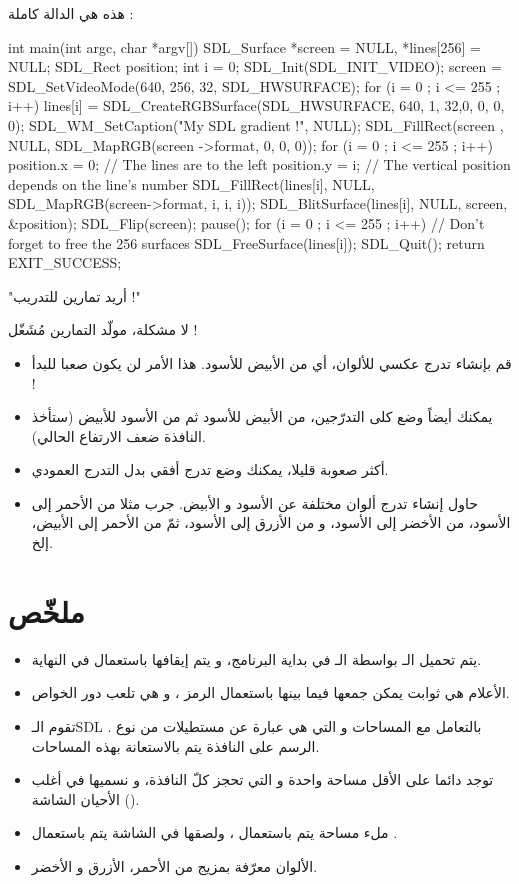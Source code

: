 هذه هي الدالة
كاملة :

\begin{Csource}
int main(int argc, char *argv[])
{
	SDL_Surface *screen = NULL, *lines[256] = {NULL};
	SDL_Rect position;
	int i = 0;
	SDL_Init(SDL_INIT_VIDEO);
	screen = SDL_SetVideoMode(640, 256, 32, SDL_HWSURFACE);
	for (i = 0 ; i <= 255 ; i++)
		lines[i] = SDL_CreateRGBSurface(SDL_HWSURFACE, 640, 1, 32,0, 0, 0, 0);
	SDL_WM_SetCaption("My SDL gradient !", NULL);
	SDL_FillRect(screen , NULL, SDL_MapRGB(screen ->format, 0, 0, 0));
	for (i = 0 ; i <= 255 ; i++)
	{
		position.x = 0; // The lines are to the left
		position.y = i; // The vertical position depends on the line's number
		SDL_FillRect(lines[i], NULL, SDL_MapRGB(screen->format, i, i, i));
		SDL_BlitSurface(lines[i], NULL, screen, &position);
	}
	SDL_Flip(screen);
	pause();
	for (i = 0 ; i <= 255 ; i++) // Don't forget to free the 256 surfaces
		SDL_FreeSurface(lines[i]);
	SDL_Quit();
	return EXIT_SUCCESS;
}
\end{Csource}

{\large"أريد تمارين للتدريب !"}

لا مشكلة، مولّد التمارين مُشَغّل !

\begin{itemize}
	\item قم بإنشاء تدرج عكسي للألوان، أي من الأبيض للأسود. هذا الأمر لن يكون صعبا للبدأ !
	\item يمكنك أيضاً وضع كلى التدرّجين، من الأبيض للأسود ثم من الأسود للأبيض (ستأخذ النافذة ضعف الارتفاع الحالي).
	\item أكثر صعوبة قليلا، يمكنك وضع تدرج أفقي بدل التدرج العمودي.
	\item حاول إنشاء تدرج ألوان مختلفة عن الأسود و الأبيض. جرب مثلا من الأحمر إلى الأسود، من الأخضر إلى الأسود، و من الأزرق إلى الأسود، ثمّ من الأحمر إلى الأبيض، إلخ.
\end{itemize}

\section*{ملخّص}

\begin{itemize}
	\item يتم تحميل الـ
	بواسطة الـ
	في بداية البرنامج، و يتم إيقافها باستعمال
	في النهاية.
	\item الأعلام هي ثوابت يمكن جمعها فيما بينها باستعمال الرمز 
	\InlineCode{|}،
	 و هي تلعب دور الخواص.
	\item تقوم الـ\textenglish{SDL}
	بالتعامل مع المساحات و التي هي عبارة عن مستطيلات من نوع 
	.
	الرسم على النافذة يتم بالاستعانة بهذه المساحات.
	\item توجد دائما على الأقل مساحة واحدة و التي تحجز كلّ النافذة، و نسميها في أغلب الأحيان الشاشة 
	().
	\item ملء مساحة يتم باستعمال
	،
	ولصقها في الشاشة يتم باستعمال
	.
	\item الألوان معرّفة بمزيج من الأحمر، الأزرق و الأخضر.
\end{itemize}
